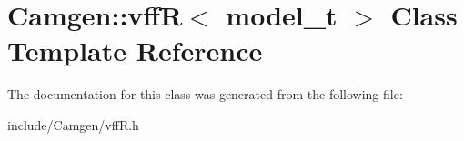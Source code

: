 \hypertarget{a00571}{\section{Camgen\-:\-:vff\-R$<$ model\-\_\-t $>$ Class Template Reference}
\label{a00571}
}


The documentation for this class was generated from the following file\-:\begin{DoxyCompactItemize}
\item 
include/\-Camgen/vff\-R.\-h\end{DoxyCompactItemize}

